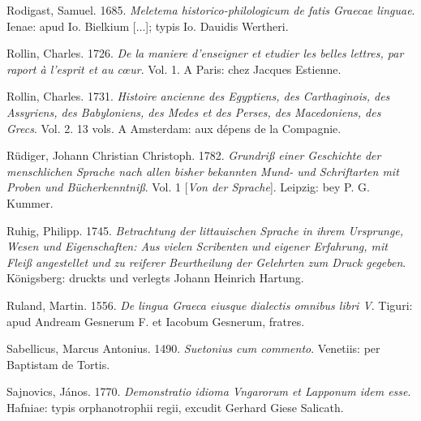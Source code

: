 \begin{styleStandard}
Rodigast, Samuel. 1685. \textit{Meletema historico-philologicum de fatis Graecae linguae}. Ienae: apud Io. Bielkium [...]; typis Io. Dauidis Wertheri.
\end{styleStandard}

\begin{styleStandard}
Rollin, Charles. 1726. \textit{De la maniere d’enseigner et etudier les belles lettres, par raport à l’esprit et au cœur}. Vol. 1. A Paris: chez Jacques Estienne.
\end{styleStandard}

\begin{styleStandard}
Rollin, Charles. 1731. \textit{Histoire ancienne des Egyptiens, des Carthaginois, des Assyriens, des Babyloniens, des Medes et des Perses, des Macedoniens, des Grecs}. Vol. 2. 13 vols. A Amsterdam: aux dépens de la Compagnie.
\end{styleStandard}

\begin{styleStandard}
Rüdiger, Johann Christian Christoph. 1782. \textit{Grundriß einer Geschichte der menschlichen Sprache nach allen bisher bekannten Mund- und Schriftarten mit Proben und Bücherkenntniß}. Vol. 1 [\textit{Von der Sprache}]. Leipzig: bey P. G. Kummer.
\end{styleStandard}

\begin{styleStandard}
Ruhig, Philipp. 1745. \textit{Betrachtung der littauischen Sprache in ihrem Ursprunge, Wesen und Eigenschaften: Aus vielen Scribenten und eigener Erfahrung, mit Fleiß angestellet und zu reiferer Beurtheilung der Gelehrten zum Druck gegeben}. Königsberg: druckts und verlegts Johann Heinrich Hartung.
\end{styleStandard}

\begin{styleStandard}
Ruland, Martin. 1556. \textit{De lingua Graeca eiusque dialectis omnibus libri V}. Tiguri: apud Andream Gesnerum F. et Iacobum Gesnerum, fratres.
\end{styleStandard}

\begin{styleStandard}
Sabellicus, Marcus Antonius. 1490. \textit{Suetonius cum commento}. Venetiis: per Baptistam de Tortis.
\end{styleStandard}

\begin{styleStandard}
Sajnovics, János. 1770. \textit{Demonstratio idioma Vngarorum et Lapponum idem esse}. Hafniae: typis orphanotrophii regii, excudit Gerhard Giese Salicath.
\end{styleStandard}

